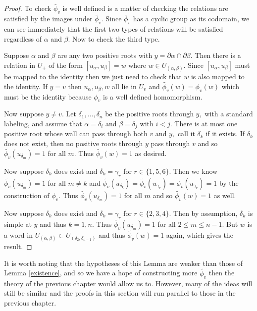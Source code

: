 \documentclass[class=book, crop=false]{standalone}
\begin{document}
\begin{proof}
	To check $\tilde{\phi_v}$ is well defined is a matter of checking the relations are satisfied by the images under $\tilde{\phi_v}.$ Since $\tilde{\phi_v}$ has a cyclic group as its codomain, we can see immediately that the first two types of relations will be satisfied regardless of $\alpha$ and $\beta.$ Now to check the third type.

	Suppose $\alpha$ and $\beta$ are any two positive roots with $y=\partial\alpha\cap \partial\beta.$ Then there is a relation in $U_+$ of the form $[u_\alpha,u_\beta]=w$ where $w\in U_{(\alpha,\beta)}.$ Since $[u_\alpha,u_\beta]$ must be mapped to the identity then we just need to check that $w$ is also mapped to the identity. If $y=v$ then $u_\alpha,u_\beta,w$ all lie in $U_v$ and $\tilde{\phi_v}(w)=\phi_v(w)$ which must be the identity because $\phi_v$ is a well defined homomorphism.

	Now suppose $y\neq v.$ Let $\delta_1,\dots,\delta_n$ be the positive roots through $y,$ with a standard labeling, and assume that $\alpha=\delta_i$ and $\beta=\delta_j$ with $i<j.$ There is at most one positive root whose wall can pass through both $v$ and $y,$ call it $\delta_k$ if it exists. If $\delta_k$ does not exist, then no positive roots through $y$ pass through $v$ and so $\tilde{\phi_v}(u_{\delta_m})=1$ for all $m.$ Thus $\tilde{\phi_v}(w)=1$ as desired.

	Now suppose $\delta_k$ does exist and $\delta_k=\gamma_r$ for $r\in \{1,5,6\}.$ Then we know $\tilde{\phi_v}(u_{\delta_m})=1$ for all  $m\neq k$ and $\tilde{\phi_v}(u_{\delta_k})=\tilde{\phi_v}(u_{\gamma_r})=\phi_v(u_{\gamma_r})=1$ by the construction of $\phi_v.$ Thus $\tilde{\phi_v}(u_{\delta_m})=1$ for all $m$ and so $\tilde{\phi_v}(w)=1$ as well.

	Now suppose $\delta_k$ does exist and $\delta_k=\gamma_r$ for $r\in \{2,3,4\}.$ Then by assumption, $\delta_k$ is simple at $y$ and thus $k=1,n.$ Thus $\tilde{\phi_v}(u_{\delta_m})=1$ for all $2\le m\le n-1.$ But $w$ is a word in $U_{(\alpha,\beta)}\subset U_{(\delta_2,\delta_{n-1})}$ and thus $\tilde{\phi_v}(w)=1$ again, which gives the result.
\end{proof}

It is worth noting that the hypotheses of this Lemma are weaker than those of Lemma \ref{existence}, and so we have a hope of constructing more $\tilde{\phi_v}$ then the theory of the previous chapter would allow us to. However, many of the ideas will still be similar and the proofs in this section will run parallel to those in the previous chapter.
\end{document}
